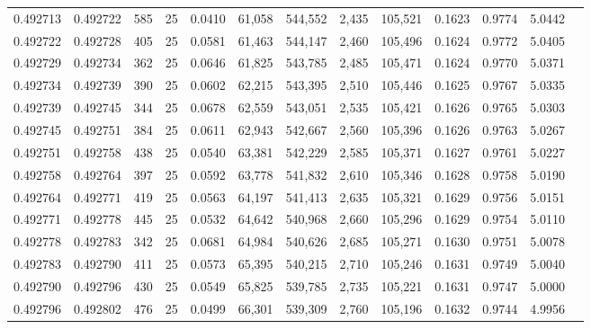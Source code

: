 \begin{tabular}{rrrrrrrrrrrrr}
0.492713 & 0.492722 &   585 &  25 &                                     0.0410 &  61,058 & 544,552 &   2,435 & 105,521 & 0.1623 & 0.9774 & 5.0442 \\
0.492722 & 0.492728 &   405 &  25 &                                     0.0581 &  61,463 & 544,147 &   2,460 & 105,496 & 0.1624 & 0.9772 & 5.0405 \\
0.492729 & 0.492734 &   362 &  25 &                                     0.0646 &  61,825 & 543,785 &   2,485 & 105,471 & 0.1624 & 0.9770 & 5.0371 \\
0.492734 & 0.492739 &   390 &  25 &                                     0.0602 &  62,215 & 543,395 &   2,510 & 105,446 & 0.1625 & 0.9767 & 5.0335 \\
0.492739 & 0.492745 &   344 &  25 &                                     0.0678 &  62,559 & 543,051 &   2,535 & 105,421 & 0.1626 & 0.9765 & 5.0303 \\
0.492745 & 0.492751 &   384 &  25 &                                     0.0611 &  62,943 & 542,667 &   2,560 & 105,396 & 0.1626 & 0.9763 & 5.0267 \\
0.492751 & 0.492758 &   438 &  25 &                                     0.0540 &  63,381 & 542,229 &   2,585 & 105,371 & 0.1627 & 0.9761 & 5.0227 \\
0.492758 & 0.492764 &   397 &  25 &                                     0.0592 &  63,778 & 541,832 &   2,610 & 105,346 & 0.1628 & 0.9758 & 5.0190 \\
0.492764 & 0.492771 &   419 &  25 &                                     0.0563 &  64,197 & 541,413 &   2,635 & 105,321 & 0.1629 & 0.9756 & 5.0151 \\
0.492771 & 0.492778 &   445 &  25 &                                     0.0532 &  64,642 & 540,968 &   2,660 & 105,296 & 0.1629 & 0.9754 & 5.0110 \\
0.492778 & 0.492783 &   342 &  25 &                                     0.0681 &  64,984 & 540,626 &   2,685 & 105,271 & 0.1630 & 0.9751 & 5.0078 \\
0.492783 & 0.492790 &   411 &  25 &                                     0.0573 &  65,395 & 540,215 &   2,710 & 105,246 & 0.1631 & 0.9749 & 5.0040 \\
0.492790 & 0.492796 &   430 &  25 &                                     0.0549 &  65,825 & 539,785 &   2,735 & 105,221 & 0.1631 & 0.9747 & 5.0000 \\
0.492796 & 0.492802 &   476 &  25 &                                     0.0499 &  66,301 & 539,309 &   2,760 & 105,196 & 0.1632 & 0.9744 & 4.9956 \\

\end{tabular}
